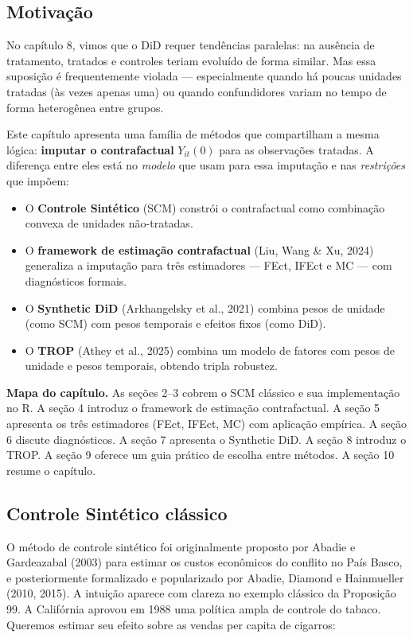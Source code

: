 \documentclass[
]{article}
\providecommand{\tightlist}{%
  \setlength{\itemsep}{0pt}\setlength{\parskip}{0pt}}
\begin{document}
\subsection{Motivação}\label{motivauxe7uxe3o}

No capítulo 8, vimos que o DiD requer tendências paralelas: na ausência de tratamento, tratados e controles teriam evoluído de forma similar. Mas essa suposição é frequentemente violada --- especialmente quando há poucas unidades tratadas (às vezes apenas uma) ou quando confundidores variam no tempo de forma heterogênea entre grupos.

Este capítulo apresenta uma família de métodos que compartilham a mesma lógica: \textbf{imputar o contrafactual} \(Y_{it}(0)\) para as observações tratadas. A diferença entre eles está no \emph{modelo} que usam para essa imputação e nas \emph{restrições} que impõem:

\begin{itemize}
\tightlist
\item
  O \textbf{Controle Sintético} (SCM) constrói o contrafactual como combinação convexa de unidades não-tratadas.
\item
  O \textbf{framework de estimação contrafactual} (Liu, Wang \& Xu, 2024) generaliza a imputação para três estimadores --- FEct, IFEct e MC --- com diagnósticos formais.
\item
  O \textbf{Synthetic DiD} (Arkhangelsky et al., 2021) combina pesos de unidade (como SCM) com pesos temporais e efeitos fixos (como DiD).
\item
  O \textbf{TROP} (Athey et al., 2025) combina um modelo de fatores com pesos de unidade e pesos temporais, obtendo tripla robustez.
\end{itemize}

\textbf{Mapa do capítulo.} As seções 2--3 cobrem o SCM clássico e sua implementação no R. A seção 4 introduz o framework de estimação contrafactual. A seção 5 apresenta os três estimadores (FEct, IFEct, MC) com aplicação empírica. A seção 6 discute diagnósticos. A seção 7 apresenta o Synthetic DiD. A seção 8 introduz o TROP. A seção 9 oferece um guia prático de escolha entre métodos. A seção 10 resume o capítulo.

\subsection{Controle Sintético clássico}\label{controle-sintuxe9tico-cluxe1ssico}

O método de controle sintético foi originalmente proposto por Abadie e Gardeazabal (2003) para estimar os custos econômicos do conflito no País Basco, e posteriormente formalizado e popularizado por Abadie, Diamond e Hainmueller (2010, 2015). A intuição aparece com clareza no exemplo clássico da Proposição 99. A Califórnia aprovou em 1988 uma política ampla de controle do tabaco. Queremos estimar seu efeito sobre as vendas per capita de cigarros:
\end{document}
